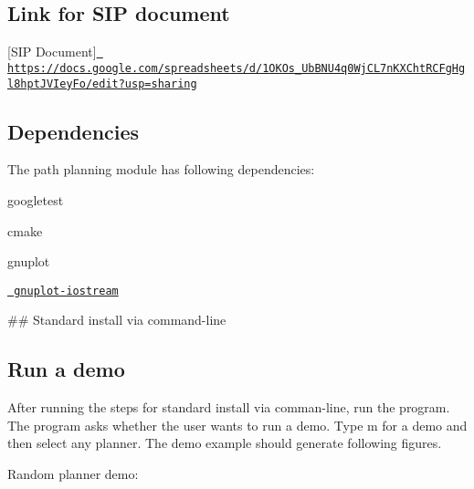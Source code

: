\subsection*{Link for S\+IP document}

\mbox{[}S\+IP Document\mbox{]}\href{https://docs.google.com/spreadsheets/d/1OKOs_5UbBNU4q0WjCL7nKXChtRCFgHgl8hptJVIeyFo/edit?usp=sharing}\texttt{ https\+://docs.\+google.\+com/spreadsheets/d/1\+O\+K\+Os\+\_\+Ub\+B\+N\+U4q0\+Wj\+C\+L7n\+K\+X\+Cht\+R\+C\+Fg\+Hgl8hpt\+J\+V\+Iey\+Fo/edit?usp=sharing}

\subsection*{Dependencies}

The path planning module has following dependencies\+:
\begin{DoxyEnumerate}
\item googletest
\item cmake
\item gnuplot
\item \href{http://stahlke.org/dan/gnuplot-iostream/}\texttt{ gnuplot-\/iostream}
\end{DoxyEnumerate}

\#\# Standard install via command-\/line 
\begin{DoxyCode}{0}
\end{DoxyCode}


\subsection*{Run a demo}

After running the steps for standard install via comman-\/line, run the program. The program asks whether the user wants to run a demo. Type \textquotesingle{}m\textquotesingle{} for a demo and then select any planner. The demo example should generate following figures.


\begin{DoxyEnumerate}
\item Random planner demo\+:
\end{DoxyEnumerate}


